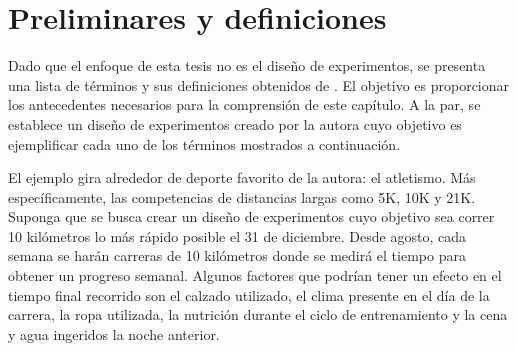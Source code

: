 \section{Preliminares y definiciones}

Dado que el enfoque de esta tesis no es el diseño de experimentos, se presenta una lista de términos y sus definiciones obtenidos de \cite{lawson2015design}. El objetivo es proporcionar los antecedentes necesarios para la comprensión de este capítulo. A la par, se establece un diseño de experimentos creado por la autora cuyo objetivo es ejemplificar cada uno de los términos mostrados a continuación. 

El ejemplo gira alrededor de deporte favorito de la autora: el atletismo. Más específicamente, las competencias de distancias largas como 5K, 10K y 21K. Suponga que se busca crear un diseño de experimentos cuyo objetivo sea correr 10 kilómetros lo más rápido posible el 31 de diciembre. Desde agosto, cada semana se harán carreras de 10 kilómetros donde se medirá el tiempo para obtener un progreso semanal. Algunos factores que podrían tener un efecto en el tiempo final recorrido son el calzado utilizado, el clima presente en el día de la carrera, la ropa utilizada, la nutrición durante el ciclo de entrenamiento y la cena y agua ingeridos la noche anterior. 

